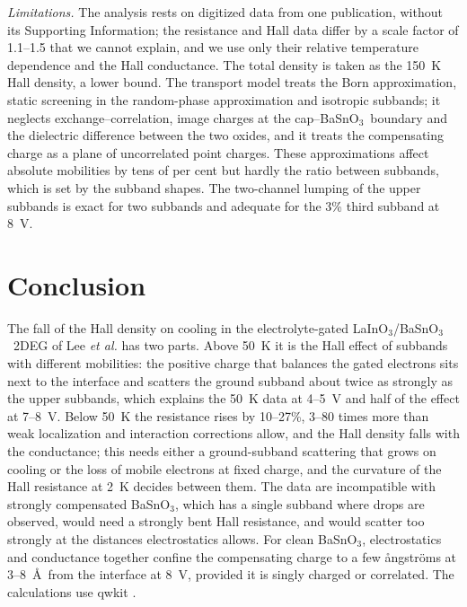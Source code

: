 \documentclass[11pt]{article}
\newcommand{\LIO}{\texorpdfstring{LaInO$_3$}{LaInO3}}
\newcommand{\BSO}{\texorpdfstring{BaSnO$_3$}{BaSnO3}}
\begin{document}
\emph{Limitations.} The analysis rests on digitized data from one publication, without its Supporting Information; the resistance and Hall data differ by a scale factor of 1.1--1.5 that we cannot explain, and we use only their relative temperature dependence and the Hall conductance. The total density is taken as the 150~K Hall density, a lower bound. The transport model treats the Born approximation, static screening in the random-phase approximation and isotropic subbands; it neglects exchange--correlation, image charges at the cap--\BSO\ boundary and the dielectric difference between the two oxides, and it treats the compensating charge as a plane of uncorrelated point charges. These approximations affect absolute mobilities by tens of per cent but hardly the ratio between subbands, which is set by the subband shapes. The two-channel lumping of the upper subbands is exact for two subbands and adequate for the 3\% third subband at 8~V.

\section{Conclusion}
The fall of the Hall density on cooling in the electrolyte-gated \LIO/\BSO\ 2DEG of Lee \emph{et al.} has two parts. Above 50~K it is the Hall effect of subbands with different mobilities: the positive charge that balances the gated electrons sits next to the interface and scatters the ground subband about twice as strongly as the upper subbands, which explains the 50~K data at 4--5~V and half of the effect at 7--8~V. Below 50~K the resistance rises by 10--27\%, 3--80 times more than weak localization and interaction corrections allow, and the Hall density falls with the conductance; this needs either a ground-subband scattering that grows on cooling or the loss of mobile electrons at fixed charge, and the curvature of the Hall resistance at 2~K decides between them. The data are incompatible with strongly compensated \BSO, which has a single subband where drops are observed, would need a strongly bent Hall resistance, and would scatter too strongly at the distances electrostatics allows. For clean \BSO, electrostatics and conductance together confine the compensating charge to a few \aa ngstr\"oms at 3--8~\AA\ from the interface at 8~V, provided it is singly charged or correlated. The calculations use qwkit \cite{qwkit}.



\end{document}
